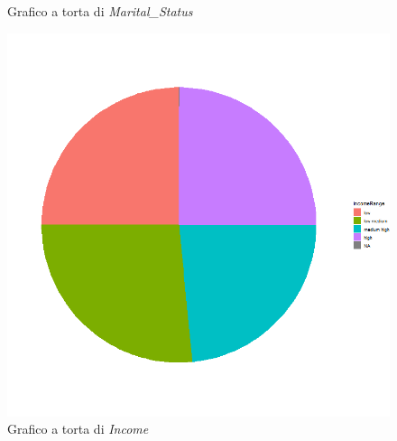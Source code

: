 \begin{frame}[fragile]
\begin{figure}[!htb]
  \caption{Grafico a torta di \textit{Marital\_Status}}\label{fig:PiePlotMt}
\endminipage\hfill
{}%
  \includegraphics[width=\linewidth]{Img/eda/EDA003.png}
  \caption{Grafico a torta di \textit{Income}}\label{fig:PiePlotIncome}
\endminipage
\end{figure}
\end{frame}
